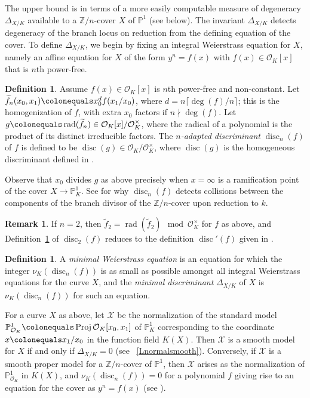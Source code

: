 \documentclass[12pt]{amsart}
\numberwithin{equation}{section}
\theoremstyle{definition}
\newtheorem{remark}[equation]{Remark}
\newtheorem{defn}[equation]{Definition}
\newcommand{\mc}[1]{\mathcal{#1}}
\newcommand{\ints}{\mathbb Z}
\newcommand{\proj}{\mathbb P}
\DeclareMathOperator{\disc}{disc}
\DeclareMathOperator{\Proj}{Proj}
\DeclareMathOperator{\rad}{rad}
\begin{document}
The upper bound is in terms of a more easily computable measure of degeneracy $\Delta_{X/K}$ available to a $\ints/n$-cover $X$ of $\proj^1$ (see  below). The invariant $\Delta_{X/K}$ detects degeneracy of the branch locus on
reduction from the defining equation of the cover. To define $\Delta_{X/K}$, we begin by fixing an integral Weierstrass equation for $X$, namely an affine equation for $X$ of the form $y^n=f(x)$ with $f(x) \in \mc{O}_K[x]$ that is $n$th power-free.



\begin{defn}\label{Dpolydisc}
Assume $f(x) \in \mc{O}_K[x]$ is $n$th power-free and non-constant. Let $\widetilde{f}_n(x_0, x_1) \colonequals x_0^df(x_1/x_0)$, where
$d = n\lceil \deg(f)/n \rceil$; this is the homogenization of
$f$, with extra $x_0$ factors if $n \nmid \deg(f)$.  Let $g \colonequals \rad(\widetilde{f}_n) \in \mc{O}_K[x]/\mc{O}_K^{\times}$, where the radical of a polynomial is the product of its distinct irreducible factors. The \emph{$n$-adapted discriminant} $\disc_n(f)$ of $f$ is defined to be $\disc(g) \in \mc{O}_K/\mc{O}_K^\times$,
where $\disc(g)$ is the homogeneous discriminant defined in \cite[Ch.\
12, (1.22),(1.29)]{GKZ}.
\end{defn}

Observe that $x_0$ divides $g$ as above precisely when $x=\infty$ is a ramification point of the cover $X \to \proj^1_K$. See  for why $\disc_n(f)$ detects collisions between the components of the branch divisor of the $\ints/n$-cover upon reduction to $k$. 


\begin{remark}\label{Rhyperelliptic}
If $n = 2$, then $\widetilde{f}_2 = \rad(\widetilde{f}_2) \mod \mc{O}_K^\times$ for $f$ as above, and Definition~\ref{Ddiscriminant} of
$\disc_2(f)$ reduces to the definition $\disc'(f)$ given in \cite{OShyper_published}. 
\end{remark}


\begin{defn}\label{Ddiscriminant} A \emph{minimal Weierstrass equation} is an equation for which the integer $\nu_K(\disc_n(f))$ is as small as possible amongst all integral Weierstrass equations for the curve $X$, and
the \emph{minimal discriminant} $\Delta_{X/K}$ of $X$ is
$\nu_K(\disc_n(f))$ for such an equation. \end{defn}



For a curve $X$ as above, let $\mc{X}$ be the normalization of the standard model
$\proj^1_{\mc{O}_K} \colonequals \Proj \mc{O}_K[x_0, x_1]$ of $\proj^1_K$ corresponding to the coordinate
$x \colonequals x_1/x_0$ in the function field $K(X)$. Then $\mc{X}$ is a smooth model for $X$ if and only if $\Delta_{X/K} = 0$ (see ~\ref{Lnormalsmooth}).
Conversely, if $\mc{X}$ is a smooth proper model for a $\ints/n$-cover of $\proj^1$, then $\mc{X}$ arises as the normalization of $\proj^1_{\mc{O}_K}$ in $K(X)$, and $\nu_K(\disc_n(f)) = 0$ for a polynomial $f$ giving rise to an equation for the cover as $y^n=f(x)$ (see ). 
\end{document}

